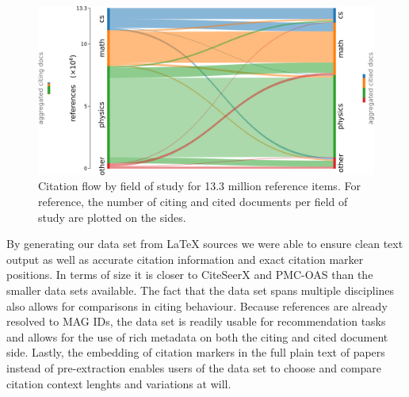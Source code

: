 \begin{figure}
  \centering
    \includegraphics[width=\textwidth]{figures/dataset/citation_relation_sankey.pdf}
  \caption[Citation flow by field of study for 13.3 million reference items.]{Citation flow by field of study for 13.3 million reference items. For reference, the number of citing and cited documents per field of study are plotted on the sides.}
  \label{fig:sankey}
\end{figure}

By generating our data set from \LaTeX{} sources we were able to ensure clean text output as well as accurate citation information and exact citation marker positions. In terms of size it is closer to CiteSeerX and PMC-OAS than the smaller data sets available. The fact that the data set spans multiple disciplines also allows for comparisons in citing behaviour. Because references are already resolved to MAG IDs, the data set is readily usable for recommendation tasks and allows for the use of rich metadata on both the citing and cited document side. Lastly, the embedding of citation markers in the full plain text of papers instead of pre-extraction enables users of the data set to choose and compare citation context lenghts and variations at will.
